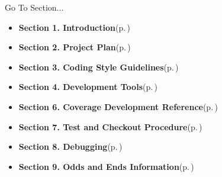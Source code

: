 \begin{Desc}
\item[Go To Section...]\begin{itemize}
\item {\bf Section 1.  Introduction}{\rm (p.\,\pageref{page_intro})}\item {\bf Section 2.  Project Plan}{\rm (p.\,\pageref{page_project_plan})}\item {\bf Section 3.  Coding Style Guidelines}{\rm (p.\,\pageref{page_code_style})}\item {\bf Section 4.  Development Tools}{\rm (p.\,\pageref{page_tools})}\item {\bf Section 6.  Coverage Development Reference}{\rm (p.\,\pageref{page_code_details})}\item {\bf Section 7.  Test and Checkout Procedure}{\rm (p.\,\pageref{page_testing})}\item {\bf Section 8.  Debugging}{\rm (p.\,\pageref{page_debugging})}\item {\bf Section 9.  Odds and Ends Information}{\rm (p.\,\pageref{page_misc})} \end{itemize}
\end{Desc}
